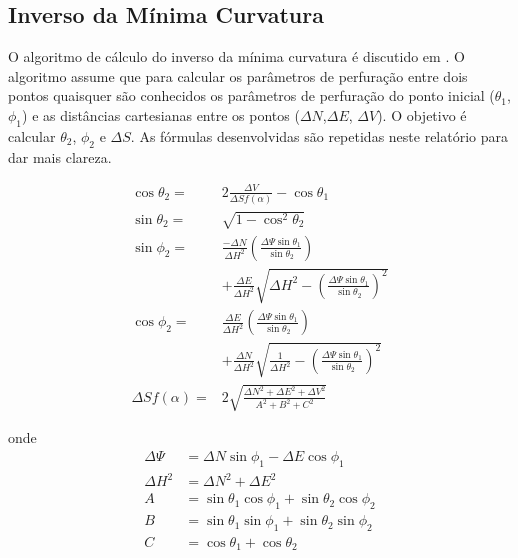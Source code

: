 \documentclass[final,5p]{elsarticle}
\numberwithin{equation}{section}
\begin{document}
\subsection{Inverso da Mínima Curvatura}

O algoritmo de cálculo do inverso da mínima curvatura é discutido em \cite{relatoriobisseccao}. O algoritmo assume que para calcular os parâmetros de perfuração entre dois pontos quaisquer são conhecidos os parâmetros de perfuração do ponto inicial ($\theta_1$, $\phi_1$) e as distâncias cartesianas entre os pontos ($\Delta N$,$\Delta E$, $\Delta V$). O objetivo é calcular $\theta_2$, $\phi_2$ e $\Delta S$. As fórmulas desenvolvidas são repetidas neste relatório para dar mais clareza.

\begin{subequations}\label{eq:inversomcm}
    \begin{align}
        \cos \theta_2 =& 2 \frac{\Delta V}{\Delta S f(\alpha)} - \cos \theta_1 \label{eq:costheta2} \\ 
        \sin \theta_2 =& \sqrt{1 - \cos^2 \theta_2} \label{eq:sintheta2} \\
        \sin \phi_2 =& \frac{-\Delta N}{\Delta H^2} \left( \frac{\Delta \Psi \sin \theta_1}{\sin \theta_2} \right) \nonumber \\
        & + \frac{\Delta E}{\Delta H^2} \sqrt{\Delta H^2 - \left( \frac{\Delta \Psi \sin \theta_1}{\sin \theta_2} \right)^2} \label{eq:sinphi2} \\
        \cos \phi_2 =& \frac{\Delta E}{\Delta H^2} \left( \frac{\Delta \Psi \sin \theta_1}{\sin \theta_2} \right) \nonumber \\
        & + \frac{\Delta N}{\Delta H^2} \sqrt{\frac{1}{\Delta H^2} - \left( \frac{\Delta \Psi \sin \theta_1}{\sin \theta_2} \right)^2} \label{eq:cosphi2} \\
        \Delta S f(\alpha) =& 2 \sqrt{\frac{\Delta N^2 + \Delta E^2 + \Delta V^2}{A^2+B^2+C^2}} \label{eq:DeltaSfa}
    \end{align}
\end{subequations}

onde
\begin{align*}
    \Delta \Psi &= \Delta N \sin \phi_1 - \Delta E \cos \phi_1 \\
    \Delta H^2 &= \Delta N^2 + \Delta E^2 \\
    A &= \sin \theta_1 \cos \phi_1 + \sin \theta_2 \cos \phi_2 \\
    B &= \sin \theta_1 \sin \phi_1 + \sin \theta_2 \sin \phi_2 \\
    C &= \cos \theta_1 + \cos \theta_2
\end{align*}
\end{document}
